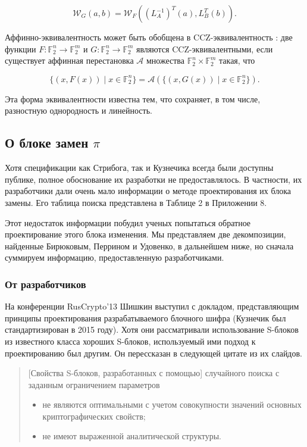 \[
\mathcal{W}_G(a, b) = \mathcal{W}_F((L_A^{-1})^T(a), L_B^T(b)).
\]

Аффинно-эквивалентность может быть обобщена в CCZ-эквивалентность \cite{CCZ98}: две функции \( F: \mathbb{F}_2^n \rightarrow \mathbb{F}_2^m \) и \( G: \mathbb{F}_2^n \rightarrow \mathbb{F}_2^m \) являются CCZ-эквивалентными, если существует аффинная перестановка \( \mathcal{A} \) множества \(\mathbb{F}_2^n \times \mathbb{F}_2^m\) такая, что

\[
\{(x, F(x)) \mid x \in \mathbb{F}_2^n \} = \mathcal{A}(\{(x, G(x)) \mid x \in \mathbb{F}_2^n \}).
\]

Эта форма эквивалентности известна тем, что сохраняет, в том числе, разностную однородность и линейность.

\subsection{О блоке замен \(\pi\)}

Хотя спецификации как Стрибога, так и Кузнечика всегда были доступны публике, полное обоснование их разработки не предоставлялось. В частности, их разработчики дали очень мало информации о методе проектирования их блока замены. Его таблица поиска представлена в Таблице 2 в Приложении 8.

Этот недостаток информации побудил ученых попытаться обратное проектирование этого блока изменения. Мы представляем две декомпозиции, найденные Бирюковым, Перрином и Удовенко, в дальнейшем ниже, но сначала суммируем информацию, предоставленную разработчиками.

\subsubsection{От разработчиков}

На конференции RusCrypto'13 \cite{Shi13} Шишкин выступил с докладом, представляющим принципы проектирования разрабатываемого блочного шифра (Кузнечик был стандартизирован в 2015 году). Хотя они рассматривали использование S-блоков из известного класса хороших S-блоков, используемый ими подход к проектированию был другим. Он перессказан в следующей цитате из их слайдов.

\begin{quote}
[Свойства S-блоков, разработанных с помощью] случайного поиска с заданным ограничением параметров
\begin{itemize}
        \item не являются оптимальными с учетом совокупности значений основных криптографических свойств;
        \item не имеют выраженной аналитической структуры.
\end{itemize}
\end{quote}

